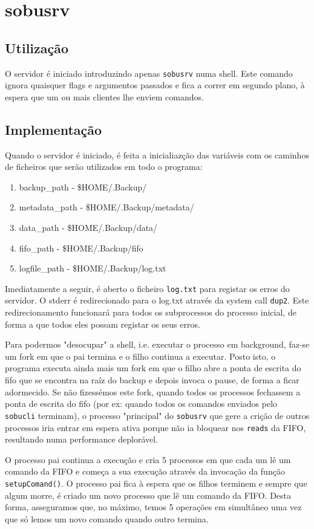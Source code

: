\section{sobusrv}
\subsection{Utilização}
O servidor é iniciado introduzindo apenas \texttt{sobusrv} numa shell. Este comando ignora quaisquer flags e argumentos passados e fica a correr em segundo plano, à 
espera que um ou mais clientes lhe enviem comandos.
\subsection{Implementação}
Quando o servidor é iniciado, é feita a inicialiazção das variáveis com os caminhos de ficheiros que serão utilizados em todo o programa:
\begin{enumerate}
\item backup\_path - \$HOME/.Backup/
\item metadata\_path -  \$HOME/.Backup/metadata/
\item data\_path - \$HOME/.Backup/data/   
\item fifo\_path - \$HOME/.Backup/fifo
\item logfile\_path - \$HOME/.Backup/log.txt
\end{enumerate}
	
Imediatamente a seguir, é aberto o ficheiro \texttt{log.txt} para registar os erros do servidor. O stderr é redirecionado para o log.txt
através da system call \texttt{dup2}.
Este redirecionamento funcionará para todos os subprocessos do processo inicial, de forma a que todos eles possam registar os seus erros. 

Para podermos "desocupar" a shell, i.e. executar o processo em 
background, faz-se um fork em que o pai termina e o filho continua a executar. Posto isto, o programa executa ainda mais um fork em que o filho abre a ponta de escrita 
do fifo que se encontra na raíz do backup e depois invoca o pause, de forma a ficar adormecido.  
Se não fizessémos este fork, quando todos os processos fechassem a ponta de escrita do fifo (por ex: quando todos os comandos enviados pelo 
\texttt{sobucli} terminam), o processo "principal" do \texttt{sobusrv} que gere a crição de outros processos iria entrar em espera ativa porque não ia 
bloquear nos \texttt{reads} da FIFO, resultando numa performance deplorável. 

O processo pai continua a execução e cria 5 processos em que cada um lê um 
comando da FIFO e começa a sua execução através da invocação da função \texttt{setupComand()}. O processo pai fica à espera que os filhos terminem e sempre que algum
morre, é criado um novo processo que lê um comando da FIFO. Desta forma, asseguramos que, no máximo, temos 5 operações em simultâneo uma vez que só lemos um
novo comando quando outro termina. 

